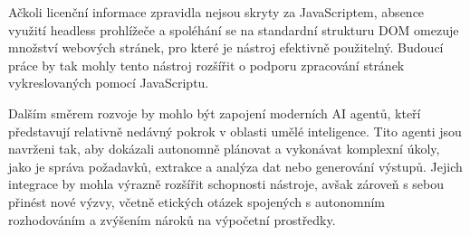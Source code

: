 Ačkoli licenční informace zpravidla nejsou skryty za JavaScriptem, absence využití headless prohlížeče a spoléhání se na standardní strukturu DOM omezuje množství webových stránek, pro které je nástroj efektivně použitelný.
Budoucí práce by tak mohly tento nástroj rozšířit o podporu zpracování stránek vykreslovaných pomocí JavaScriptu.

Dalším směrem rozvoje by mohlo být zapojení moderních AI agentů, kteří představují relativně nedávný pokrok v oblasti umělé inteligence.
Tito agenti jsou navrženi tak, aby dokázali autonomně plánovat a vykonávat komplexní úkoly, jako je správa požadavků, extrakce a analýza dat nebo generování výstupů.
Jejich integrace by mohla výrazně rozšířit schopnosti nástroje, avšak zároveň s sebou přinést nové výzvy, včetně etických otázek spojených s autonomním rozhodováním a zvýšením nároků na výpočetní prostředky.
